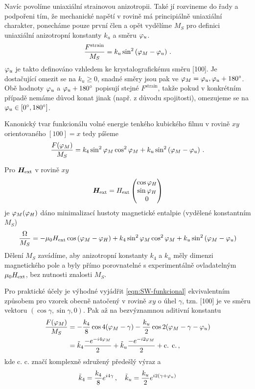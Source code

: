 Navíc povolíme uniaxiální strainovou anizotropii.
Také jí rozvineme do řady a podpořeni tím, že mechanické napětí v rovině má principiálně uniaxiální charakter, ponecháme pouze první člen a opět vydělíme $M_S$ pro definici uniaxiální anizotropní konstanty $k_u$ a směru $\varphi_u$.
\begin{equation}
    \frac{F^\textrm{strain}}{M_S}=k_u \sin^2\left( \varphi_M-\varphi_u  \right) \,.
\end{equation}
$\varphi_u$ je takto definováno vzhledem ke krystalografickému směru [100].
Je dostačující omezit se na $k_u\geq 0$, snadné směry jsou pak ve $\varphi_M=\varphi_u, \varphi_u+\SI{180}{\degree}$.
Obě hodnoty $\varphi_u$ a $\varphi_u+\SI{180}{\degree}$ popisují stejné $F^\textrm{strain}$, takže pokud v konkrétním případě nemáme důvod konat jinak (např. z důvodu spojitosti), omezujeme se na $\varphi_u \in [\SI{0}{\degree}, \SI{180}{\degree}]$.

Kanonický tvar funkcionálu volné energie tenkého kubického filmu v rovině $xy$ orientovaného $[100]=x$ tedy píšeme
\begin{equation}
\label{eqn:SW-funkcional}
    \frac{F(\varphi_M)}{M_S}=k_4 \sin^2 \varphi_M \cos^2 \varphi_M + k_u \sin^2\left( \varphi_M-\varphi_u  \right) \,.
\end{equation}

Pro $\bm{H}_\textrm{ext}$ v rovině $xy$
\begin{equation}
    \bm{H}_\textrm{ext} =H_\textrm{ext} \begin{pmatrix} \cos \varphi_H \\ \sin \varphi_H \\ 0 \end{pmatrix}
\end{equation}
je $\varphi_M(\varphi_H)$ dáno minimalizací hustoty magnetické entalpie (vydělené konstantním $M_S$)
\begin{equation}
    \frac{\Omega}{M_S}=-\mu_0 H_\textrm{ext} \cos \left(\varphi_M-\varphi_H \right) + k_4 \sin^2 \varphi_M \cos^2 \varphi_M + k_u \sin^2\left( \varphi_M-\varphi_u  \right)
\end{equation}
Dělení $M_S$ zavádíme, aby anizotropní konstanty $k_4$ a $k_u$ měly dimenzi magnetického pole a byly přímo porovnatelné s experimentálně ovladatelným $\mu_0H_\textrm{ext}$, bez nutnosti znalosti $M_S$.

Pro praktické účely je výhodné vyjádřit \eqref{eqn:SW-funkcional} ekvivalentním způsobem pro vzorek obecně natočený v rovině $xy$ o úhel $\gamma$, tzn. [100] je ve směru vektoru $(\cos\gamma, \sin\gamma, 0)$.
Pak až na bezvýznamnou aditivní konstantu
\begin{align}
\label{eqn:funkcional-otoceny}
    \frac{F(\varphi_M)}{M_S}&=-\frac{k_4}{8} \cos 4(\varphi_M-\gamma)-\frac{k_u}{2} \cos 2(\varphi_M-\gamma-\varphi_u) \\
                        &=\tilde{k}_4 \frac{-e^{-i4\varphi_M}}{2} + \tilde{k}_u \frac{-e^{-i2\varphi_M}}{2} + \textrm{c. c.}\,,
\end{align}
kde c. c. značí komplexně sdružený předešlý výraz a
\begin{equation}
    \tilde{k}_4 = \frac{k_4}{8} e^{i4\gamma} \,, \quad \tilde{k}_u = \frac{k_u}{2} e^{i2(\gamma+\varphi_u)}
\end{equation}

